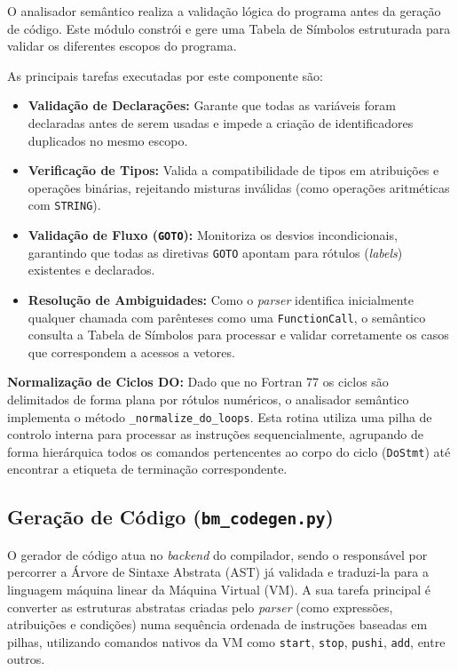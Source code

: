 \documentclass[12pt, a4paper]{article}
\begin{document}
O analisador semântico realiza a validação lógica do programa antes da geração de código. Este módulo constrói e gere uma Tabela de Símbolos estruturada para validar os diferentes escopos do programa.

As principais tarefas executadas por este componente são:
\begin{itemize}
    \item \textbf{Validação de Declarações:} Garante que todas as variáveis foram declaradas antes de serem usadas e impede a criação de identificadores duplicados no mesmo escopo.
    \item \textbf{Verificação de Tipos:} Valida a compatibilidade de tipos em atribuições e operações binárias, rejeitando misturas inválidas (como operações aritméticas com \texttt{STRING}).
    \item \textbf{Validação de Fluxo (\texttt{GOTO}):} Monitoriza os desvios incondicionais, garantindo que todas as diretivas \texttt{GOTO} apontam para rótulos (\textit{labels}) existentes e declarados.
    \item \textbf{Resolução de Ambiguidades:} Como o \textit{parser} identifica inicialmente qualquer chamada com parênteses como uma \texttt{FunctionCall}, o semântico consulta a Tabela de Símbolos para processar e validar corretamente os casos que correspondem a acessos a vetores.
\end{itemize}

\textbf{Normalização de Ciclos DO:} Dado que no Fortran 77 os ciclos são delimitados de forma plana por rótulos numéricos, o analisador semântico implementa o método \texttt{\_normalize\_do\_loops}. Esta rotina utiliza uma pilha de controlo interna para processar as instruções sequencialmente, agrupando de forma hierárquica todos os comandos pertencentes ao corpo do ciclo (\texttt{DoStmt}) até encontrar a etiqueta de terminação correspondente.

\subsection{Geração de Código (\texttt{bm\_codegen.py})}
O gerador de código atua no \textit{backend} do compilador, sendo o responsável por percorrer a Árvore de Sintaxe Abstrata (AST) já validada e traduzi-la para a linguagem máquina linear da Máquina Virtual (VM). A sua tarefa principal é converter as estruturas abstratas criadas pelo \textit{parser} (como expressões, atribuições e condições) numa sequência ordenada de instruções baseadas em pilhas, utilizando comandos nativos da VM como \texttt{start}, \texttt{stop}, \texttt{pushi}, \texttt{add}, entre outros.
\end{document}
